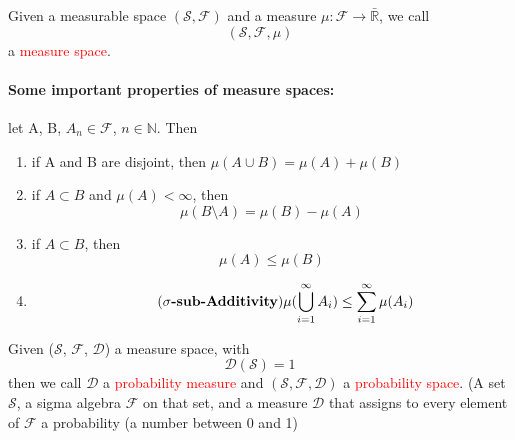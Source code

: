 \documentclass[10pt,a4paper]{article}
\theoremstyle{definition}
\theoremstyle{plain}
\begin{document}
\begin{boxedsubdef}
	Given a measurable space $\mathcal{(S, F)}$ and a measure $\mu: \mathcal{F} \rightarrow \bar{\mathbb{R}}$, we call
	$$\left(\mathcal{S, F}, \mu\right)$$
	a \textcolor{red}{measure space}.
\end{boxedsubdef}

\paragraph{Some important properties of measure spaces:} let A, B, $A_n \in \mathcal{F}$, $n \in \mathbb{N}$. Then
\begin{enumerate}
	\item if A and B are disjoint, then $\mu(A \cup B) = \mu(A) + \mu(B)$
	\item if $A \subset B$ and $\mu(A) < \infty$, then
	$$ \mu(B\setminus A) = \mu(B)-\mu(A)$$
	\item if $A \subset B$, then
	 $$\mu(A) \leq \mu(B)$$
	\item \begin{equation}
		\tag{\textbf{$\sigma\text{-sub-Additivity}$}}
		\mu (\bigcup_{i = 1}^{\infty} A_i) \leq \sum_{i = 1}^{\infty} \mu(A_i)
	\end{equation}
\end{enumerate}

\begin{boxeddef}
	Given ($\mathcal{S}$, $\mathcal{F}$, $\mathcal{D}$) a measure space, with 
	$$\mathcal{D}(\mathcal{S}) = 1$$
	then we call $\mathcal{D}$ a \textcolor{red}{probability measure} and $\mathcal{(S, F, D)}$ a \textcolor{red}{probability space}.
	(A set $\mathcal{S}$, a sigma algebra $\mathcal{F}$ on that set, and a measure $\mathcal{D}$ that assigns to every element of $\mathcal{F}$ a probability (a number between 0 and 1)
\end{boxeddef}
\end{document}

